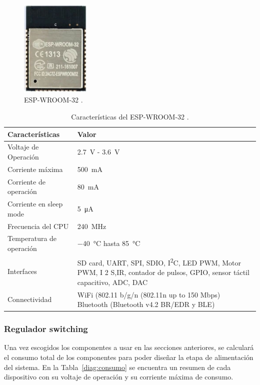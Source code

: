 \begin{figure}[hbtp!]
\centering
\includegraphics[width=0.3\textwidth]{esp32.jpg}
\caption{ESP-WROOM-32 \cite{ESP32_page}.}
\label{fig:esp-wroom32}
\end{figure}

\bgroup
\def\arraystretch{1.5}%
\begin{table}[htbp!]
\centering
\caption[Características del ESP-WROOM-32]{Características del ESP-WROOM-32 \cite{Esp32_Hardware}.}
\begin{tabular}{@{}lp{9cm}@{}}
\toprule
Características & Valor \\ \midrule
Voltaje de Operación & \SI{2.7}{V} - \SI{3.6}{V} \\
Corriente máxima & \SI{500}{mA} \\
Corriente de operación & \SI{80}{mA} \\
Corriente en sleep mode & \SI{5}{\uA} \\
Frecuencia del CPU & \SI{240}{MHz} \\
Temperatura de operación & \SI{-40}{\celsius} hasta \SI{85}{\celsius} \\
Interfaces & SD card, UART, SPI, SDIO, I\textsuperscript{2}C, LED PWM, Motor PWM, I 2 S,IR, contador de pulsos, GPIO, sensor táctil capacitivo, ADC, DAC \\
Connectividad & WiFi (802.11 b/g/n (802.11n up to 150 Mbps) Bluetooth (Bluetooth v4.2 BR/EDR y BLE)\\\bottomrule
\end{tabular}
\label{diag:ESP32}
\end{table}
\egroup









\subsubsection{Regulador switching}
Una vez escogidos los componentes a usar en las secciones anteriores, se calculará el consumo total de los componentes para poder diseñar la etapa de alimentación del sistema. En la Tabla~\ref{diag:consumo} se encuentra un resumen de cada dispositivo con su voltaje de operación y su corriente máxima de consumo.

